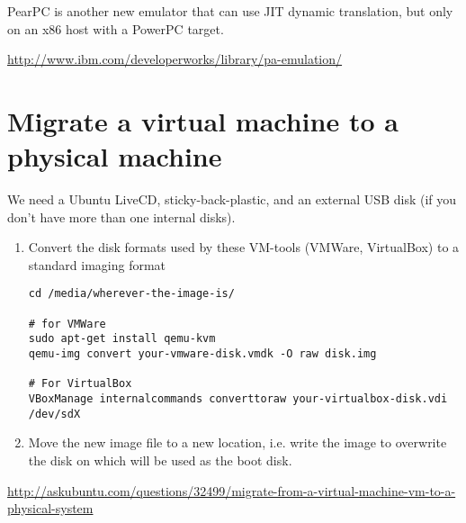 PearPC is another new emulator that can use JIT dynamic translation, but only on
an x86 host with a PowerPC target.

\url{http://www.ibm.com/developerworks/library/pa-emulation/}

\section{Migrate a virtual machine to a physical machine}

We need a Ubuntu LiveCD, sticky-back-plastic, and an external USB disk (if you
don't have more than one internal disks).

\begin{enumerate}
  \item Convert the disk formats used by these VM-tools (VMWare, VirtualBox)
  to a standard imaging format
\begin{verbatim}
cd /media/wherever-the-image-is/

# for VMWare
sudo apt-get install qemu-kvm
qemu-img convert your-vmware-disk.vmdk -O raw disk.img

# For VirtualBox
VBoxManage internalcommands converttoraw your-virtualbox-disk.vdi /dev/sdX
\end{verbatim}

  \item Move the new image file to a new location, i.e. write the image to
  overwrite the disk on which will be used as the boot disk.
\end{enumerate}


\url{http://askubuntu.com/questions/32499/migrate-from-a-virtual-machine-vm-to-a-physical-system}

